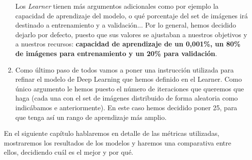 \begin{enumerate}
Los \textit{Learner} tienen más argumentos adicionales como por ejemplo la capacidad de aprendizaje del modelo, o qué porcentaje del set de imágenes irá destinado a entrenamiento y a validación... Por lo general, hemos decidido dejarlo por defecto, puesto que sus valores se ajustaban a nuestros objetivos y a nuestros recursos: \textbf{capacidad de aprendizaje de un 0,001\%, un 80\% de imágenes para entrenamiento y un 20\% para validación}.
\item Como último paso de todos vamos a poner una instrucción utilizada para refinar el modelo de Deep Learning que hemos definido en el Learner. Como único argumento le hemos puesto el número de iteraciones que queremos que haga (cada una con el set de imágenes distribuido de forma aleatoria como indicábamos e anteriormente). En este caso hemos decidido poner 25, para que tenga así un rango de aprendizaje más amplio.

\end{enumerate}

En el siguiente capítulo hablaremos en detalle de las métricas utilizadas, mostraremos los resultados de los modelos y haremos una comparativa entre ellos, decidiendo cuál es el mejor y por qué.